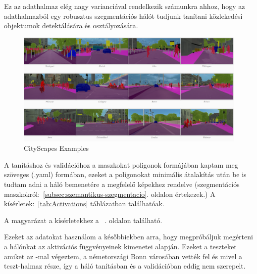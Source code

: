 \documentclass[12pt,oneside,a4paper]{article}
\theoremstyle{remark}
\begin{document}
    Ez az adathalmaz elég nagy varianciával rendelkezik számunkra ahhoz, hogy az adathalmazból egy
    robusztus szegmentációs hálót tudjunk tanítani közlekedési objektumok detektálására és osztályozására.


    \begin{figure}[ht]
       \centering
        \noindent\includegraphics[width=1\linewidth]{cityscapes}
        \caption{CityScapes Examples}
        \label{fig:CityScapes-Examples}
    \end{figure}
    A tanításhoz és validációhoz a maszkokat poligonok formájában kaptam meg szöveges (.yaml) formában, ezeket a poligonokat
    minimális átalakítás után be is tudtam adni a háló bemenetére a megfelelő képekhez rendelve (szegmentációs
    maszkokról:~\ref{subsec:szemantikus-szegmentacio}. oldalon értekezek.)
    A kísérletek:~\ref{tab:Activations} táblázatban találhatóak.

    A magyarázat a kísérletekhez a ~\pageref{subsec:magyarazat}\label{pageref}.
    oldalon található.

    Ezeket az adatokat használom a későbbiekben arra, hogy megpróbáljuk megérteni a hálónkat az aktivációs függvényeinek kimenetei
    alapján.
    Ezeket a teszteket amiket az -mal végeztem, a németországi Bonn városában
    vették fel és mivel a teszt-halmaz része, így a háló tanításban és a validációban eddig nem szerepelt.
\end{document}
